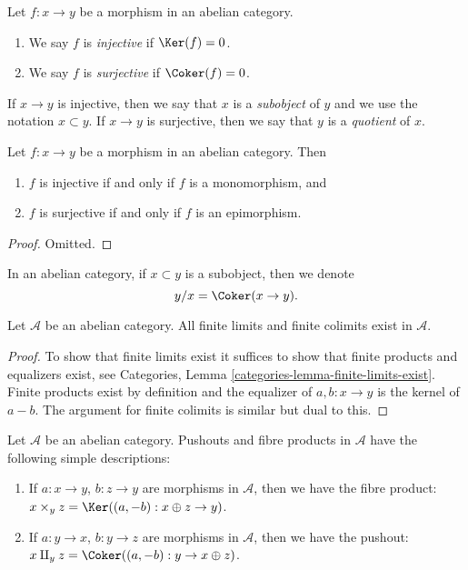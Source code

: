 \begin{definition}
\label{definition-injective-surjective}
Let $f : x \to y$ be a morphism in an abelian category.
\begin{enumerate}
\item We say $f$ is {\it injective} if $\Ker(f) = 0$.
\item We say $f$ is {\it surjective} if $\Coker(f) = 0$.
\end{enumerate}
If $x \to y$ is injective, then we say that $x$ is a {\it subobject}
of $y$ and we use the notation $x \subset y$. If $x \to y$ is
surjective, then we say that $y$ is a {\it quotient} of $x$.
\end{definition}

\begin{lemma}
\label{lemma-characterize-injective}
Let $f : x \to y$ be a morphism in an abelian category. Then
\begin{enumerate}
\item $f$ is injective if and only if $f$ is a monomorphism, and
\item $f$ is surjective if and only if $f$ is an epimorphism.
\end{enumerate}
\end{lemma}

\begin{proof}
Omitted.
\end{proof}

\noindent
In an abelian category, if $x \subset y$ is a subobject,
then we denote
$$
y/x = \Coker(x \to y).
$$

\begin{lemma}
\label{lemma-colimit-abelian-category}
Let $\mathcal{A}$ be an abelian category.
All finite limits and finite colimits exist in $\mathcal{A}$.
\end{lemma}

\begin{proof}
To show that finite limits exist it suffices to show
that finite products and equalizers exist, see
Categories, Lemma \ref{categories-lemma-finite-limits-exist}.
Finite products exist
by definition and the equalizer of $a, b : x \to y$ is
the kernel of $a - b$. The argument for finite colimits
is similar but dual to this.
\end{proof}

\begin{example}
\label{example-fibre-product-pushouts}
Let $\mathcal{A}$ be an abelian category.
Pushouts and fibre products in $\mathcal{A}$ have the following
simple descriptions:
\begin{enumerate}
\item If $a : x \to y$, $b : z \to y$ are morphisms in $\mathcal{A}$, then
we have the fibre product:
$x \times_y z = \Ker((a, -b) : x \oplus z \to y)$.
\item If $a : y \to x$, $b : y \to z$ are morphisms in $\mathcal{A}$, then
we have the pushout:
$x \amalg_y z = \Coker((a, -b) : y \to x \oplus z)$.
\end{enumerate}
\end{example}

